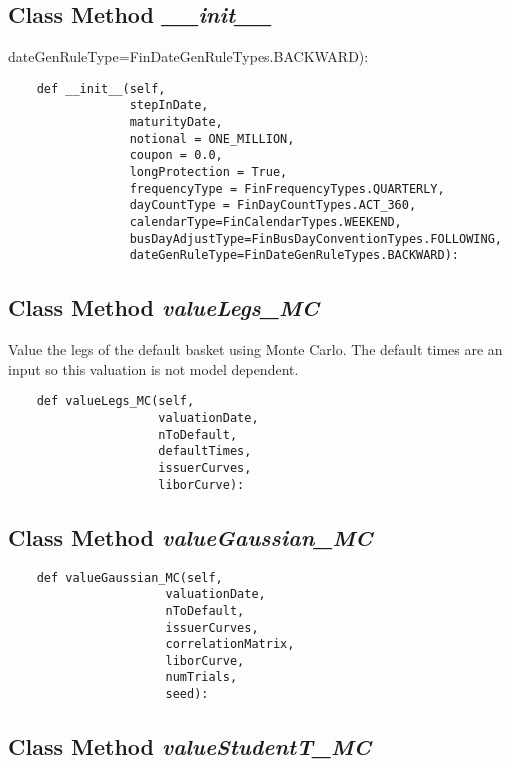 \documentclass[twoside,11pt]{book}
\begin{document}
\subsection{Class Method {\it \_\_init\_\_}}
dateGenRuleType=FinDateGenRuleTypes.BACKWARD):

\begin{lstlisting}
    def __init__(self, 
                 stepInDate,
                 maturityDate, 
                 notional = ONE_MILLION, 
                 coupon = 0.0, 
                 longProtection = True,
                 frequencyType = FinFrequencyTypes.QUARTERLY,
                 dayCountType = FinDayCountTypes.ACT_360,
                 calendarType=FinCalendarTypes.WEEKEND,
                 busDayAdjustType=FinBusDayConventionTypes.FOLLOWING,
                 dateGenRuleType=FinDateGenRuleTypes.BACKWARD):
\end{lstlisting}

\subsection{Class Method {\it valueLegs\_MC}}
Value the legs of the default basket using Monte Carlo. The default times are an input so this valuation is not model dependent. 

\begin{lstlisting}
    def valueLegs_MC(self, 
                     valuationDate,
                     nToDefault,
                     defaultTimes, 
                     issuerCurves,
                     liborCurve):
\end{lstlisting}

\subsection{Class Method {\it valueGaussian\_MC}}


\begin{lstlisting}
    def valueGaussian_MC(self, 
                      valuationDate,
                      nToDefault,
                      issuerCurves,
                      correlationMatrix,
                      liborCurve,
                      numTrials,
                      seed):
\end{lstlisting}

\subsection{Class Method {\it valueStudentT\_MC}}
\end{document}
